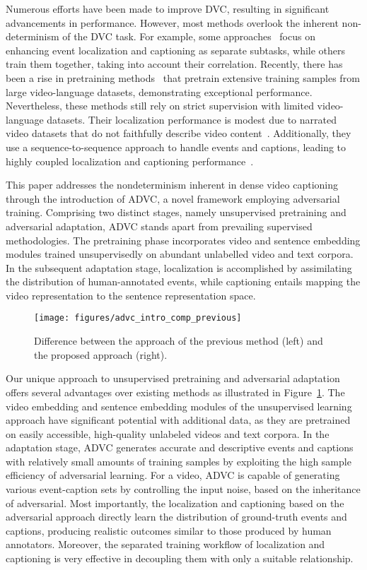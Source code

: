 Numerous efforts have been made to improve DVC, resulting in significant advancements in performance.
However, most methods overlook the inherent non-determinism of the DVC task.
For example, some approaches~\cite{Krishna2017-pw,Li2018-ll,Mun2019-ap} focus on enhancing event localization and captioning as separate subtasks, while others~\cite{Zhou2018-zu,Wang2021-zi,Deng2021-qd} train them together, taking into account their correlation.
Recently, there has been a rise in pretraining methods~\cite{Zhang2022-ni,Yang2023-fm} that pretrain extensive training samples from large video-language datasets, demonstrating exceptional performance.
Nevertheless, these methods still rely on strict supervision with limited video-language datasets.
Their localization performance is modest due to narrated video datasets that do not faithfully describe video content~\cite{Yang2023-fm}.
Additionally, they use a sequence-to-sequence approach to handle events and captions, leading to highly coupled localization and captioning performance~\cite{Zhang2022-ni}.

This paper addresses the nondeterminism inherent in dense video captioning through the introduction of ADVC, a novel framework employing adversarial training.
Comprising two distinct stages, namely unsupervised pretraining and adversarial adaptation, ADVC stands apart from prevailing supervised methodologies.
The pretraining phase incorporates video and sentence embedding modules trained unsupervisedly on abundant unlabelled video and text corpora.
In the subsequent adaptation stage, localization is accomplished by assimilating the distribution of human-annotated events, while captioning entails mapping the video representation to the sentence representation space.

\begin{figure}[t]
    \centering
    \texttt{[image: figures/advc\_intro\_comp\_previous]}
    \caption{Difference between the approach of the previous method (left) and the proposed approach (right).}
    \label{fig:intro_approach}
\end{figure}


Our unique approach to unsupervised pretraining and adversarial adaptation offers several advantages over existing methods as illustrated in Figure~\ref{fig:intro_approach}.
The video embedding and sentence embedding modules of the unsupervised learning approach have significant potential with additional data, as they are pretrained on easily accessible, high-quality unlabeled videos and text corpora.
In the adaptation stage, ADVC generates accurate and descriptive events and captions with relatively small amounts of training samples by exploiting the high sample efficiency of adversarial learning.
For a video, ADVC is capable of generating various event-caption sets by controlling the input noise, based on the inheritance of adversarial.
Most importantly, the localization and captioning based on the adversarial approach directly learn the distribution of ground-truth events and captions, 
producing realistic outcomes similar to those produced by human annotators. 
Moreover, the separated training workflow of localization and captioning is very effective in decoupling them with only a suitable relationship.

